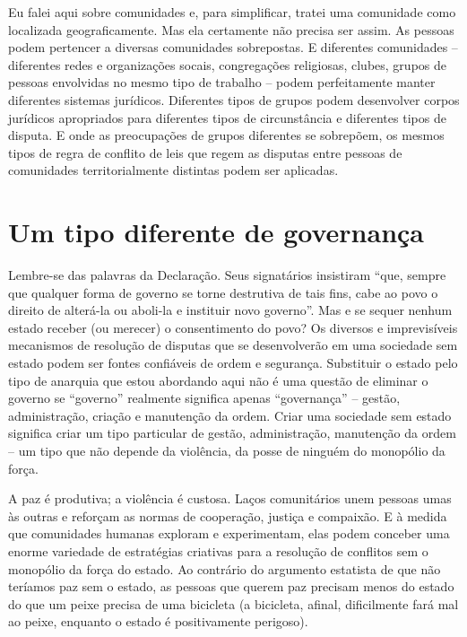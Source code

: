 Eu falei aqui sobre comunidades e, para simplificar, tratei uma comunidade como localizada geograficamente. Mas ela certamente não precisa ser assim. As pessoas podem pertencer a diversas comunidades sobrepostas. E diferentes comunidades -- diferentes redes e organizações socais, congregações religiosas, clubes, grupos de pessoas envolvidas no mesmo tipo de trabalho -- podem perfeitamente manter diferentes sistemas jurídicos. Diferentes tipos de grupos podem desenvolver corpos jurídicos apropriados para diferentes tipos de circunstância e diferentes tipos de disputa. E onde as preocupações de grupos diferentes se sobrepõem, os mesmos tipos de regra de conflito de leis que regem as disputas entre pessoas de comunidades territorialmente distintas podem ser aplicadas.

\section{Um tipo diferente de governança}

Lembre-se das palavras da Declaração. Seus signatários insistiram ``que, sempre que qualquer forma de governo se torne destrutiva de tais fins, cabe ao povo o direito de alterá-la ou aboli-la e instituir novo governo''. Mas e se sequer nenhum estado receber (ou merecer) o consentimento do povo? Os diversos e imprevisíveis mecanismos de resolução de disputas que se desenvolverão em uma sociedade sem estado podem ser fontes confiáveis de ordem e segurança. Substituir o estado pelo tipo de anarquia que estou abordando aqui não é uma questão de eliminar o governo se ``governo'' realmente significa apenas ``governança'' -- gestão, administração, criação e manutenção da ordem. Criar uma sociedade sem estado significa criar um tipo particular de gestão, administração, manutenção da ordem -- um tipo que não depende da violência, da posse de ninguém do monopólio da força.

A paz é produtiva; a violência é custosa. Laços comunitários unem pessoas umas às outras e reforçam as normas de cooperação, justiça e compaixão. E à medida que comunidades humanas exploram e experimentam, elas podem conceber uma enorme variedade de estratégias criativas para a resolução de conflitos sem o monopólio da força do estado. Ao contrário do argumento estatista de que não teríamos paz sem o estado, as pessoas que querem paz precisam menos do estado do que um peixe precisa de uma bicicleta (a bicicleta, afinal, dificilmente fará mal ao peixe, enquanto o estado é positivamente perigoso).

